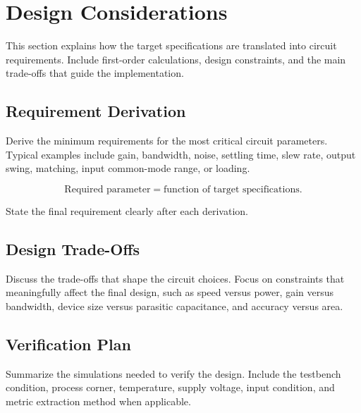 \section{Design Considerations}
\label{sec:design_considerations}

This section explains how the target specifications are translated into circuit
requirements. Include first-order calculations, design constraints, and the main
trade-offs that guide the implementation.

\subsection{Requirement Derivation}

Derive the minimum requirements for the most critical circuit parameters. Typical
examples include gain, bandwidth, noise, settling time, slew rate, output swing,
matching, input common-mode range, or loading.

\begin{equation}
    \text{Required parameter} = \text{function of target specifications}.
\end{equation}

State the final requirement clearly after each derivation.

\subsection{Design Trade-Offs}

Discuss the trade-offs that shape the circuit choices. Focus on constraints that
meaningfully affect the final design, such as speed versus power, gain versus
bandwidth, device size versus parasitic capacitance, and accuracy versus area.

\subsection{Verification Plan}

Summarize the simulations needed to verify the design. Include the testbench
condition, process corner, temperature, supply voltage, input condition, and
metric extraction method when applicable.
